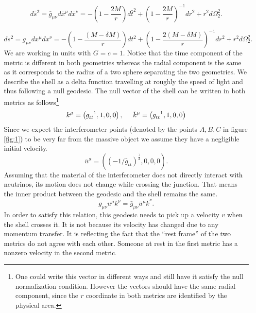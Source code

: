\documentclass[aps,showpacs,onecolumn,floats,prd,superscriptaddress,nofootinbib]{revtex4-1}
\begin{document}
\begin{equation}
	d\bar{s}^2 = \bar{g}_{\mu \nu} d\bar{x}^\mu d\bar{x}^\nu = - \left( 1 - \frac{2M}{r} \right) d\bar{t}^2 + \left( 1 - \frac{2M}{r} \right)^{-1} d {r}^2 + r^2 d {\Omega}_2^2. \label{SCH}
\end{equation}

\begin{equation}
	ds^2 = g_{\mu \nu} dx^\mu dx^\nu = - \left( 1 - \frac{(M - \delta M)}{r} \right) dt^2 + \left( 1 - \frac{2(M - \delta M)}{r} \right)^{-1} dr^2 + r^2 d \Omega_2^2. \label{SCHa}
\end{equation}
We are working in units with $G = c =1$.  Notice that the time component of the metric is different in both geometries whereas the radial component is the same as it corresponds to the radius of a two sphere separating the two geometries.  We describe the shell as a delta function travelling at roughly the speed of light and thus following a null geodesic. The null vector of the shell can be written in both metrics as follows\footnote{One could write this vector in different ways and still have it satisfy the null normalization condition. However the vectors should have the same radial component, since the $r$ coordinate in both metrics are identified by the physical area.}
\begin{equation}
	k^\mu = \left( g_{tt}^{-1}, 1, 0, 0 \right), \hspace{5mm} \bar{k}^\mu = \left( \bar{g}_{tt}^{-1}, 1, 0, 0 \right)	\label{sigma}
\end{equation}
Since we expect the interferometer points (denoted by the points $A,B,C$ in figure \ref{fig:1}) to be very far from the massive object we assume they have a negligible initial velocity.
\begin{equation}
	\bar{u}^\mu = \left( (-1/\bar{g}_{tt})^\frac{1}{2}, 0, 0, 0 \right).	\label{zeta}
\end{equation}
Assuming that the material of the interferometer does not directly interact with neutrinos, its motion does not change while crossing the junction. 
That means the inner product between the geodesic and the shell remains the same.\begin{equation}
	 g_{\mu \nu} u^\mu k^\nu = \bar{g}_{\mu \nu} \bar{u}^\mu \bar{k}^\nu. 	\label{0IJC}
\end{equation}
In order to satisfy this relation, this geodesic needs to pick up a velocity $v$ when the shell crosses it.
It is not because its velocity has changed due to any momentum transfer.
It is reflecting the fact that the ``rest frame'' of the two metrics do not agree with each other.
Someone at rest in the first metric has a nonzero velocity in the second metric.
\end{document}
